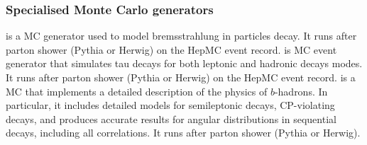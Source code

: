 \subsubsection{Specialised Monte Carlo generators}
\bi
{} \cite{PhotosPaper} is a MC generator used to model bremsstrahlung in particles decay. It runs after parton shower ({\sc Pythia} or {\sc Herwig}) on the HepMC event record.
 \cite{TauolaPaper}  is MC event generator that simulates tau decays for both leptonic and hadronic  decays  modes. It runs after parton shower ({\sc Pythia} or {\sc Herwig}) on the HepMC event record.
 \cite{Lange:2001uf} is  a MC that implements a detailed description of the physics of $b$-hadrons. In particular, it includes detailed models for semileptonic decays, CP-violating decays, and produces accurate results for angular distributions in sequential decays, including all correlations. It runs after parton shower ({\sc Pythia} or {\sc Herwig}).
\ei


